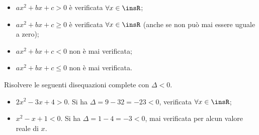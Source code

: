 \begin{itemize}
\item ${ax}^2+{bx}+c>0$ è verificata $\forall x\in \insR$;
\item ${ax}^2+{bx}+c\ge 0$ è verificata $\forall x\in \insR$ (anche se non può mai essere uguale a zero);
\item ${ax}^2+{bx}+c<0$ non è mai verificata;
\item ${ax}^2+{bx}+c\le 0$ non è mai verificata.
\end{itemize}
\pagebreak
\begin{exrig}
\begin{esempio}
Risolvere le seguenti disequazioni complete con $\Delta<0$.
\begin{itemize}
\item $2x^2-3x+4>0$. Si ha $\Delta =9-32=-23<0$, verificata $\forall x\in \insR$;
\item $x^2-x+1<0$. Si ha $\Delta =1-4=-3<0$, mai verificata per alcun valore reale di $x$.
\end{itemize}
\end{esempio}
\end{exrig}

